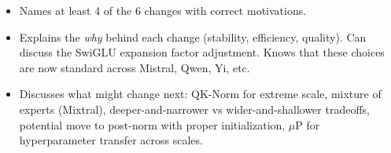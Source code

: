 \begin{interviewq}
\goodgreat
\begin{itemize}
    \item {} Names at least 4 of the 6 changes with correct motivations.
    \item {} Explains the \textit{why} behind each change (stability, efficiency, quality). Can discuss the SwiGLU expansion factor adjustment. Knows that these choices are now standard across Mistral, Qwen, Yi, etc.
    \item {} Discusses what might change next: QK-Norm for extreme scale, mixture of experts (Mixtral), deeper-and-narrower vs wider-and-shallower tradeoffs, potential move to post-norm with proper initialization, $\mu$P for hyperparameter transfer across scales.
\end{itemize}

\end{interviewq}

